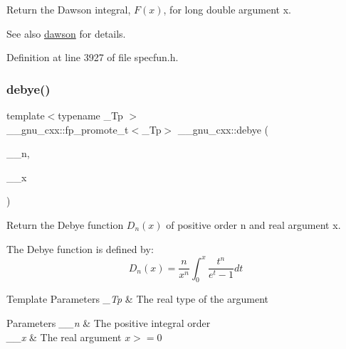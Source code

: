 Return the Dawson integral, $ F(x) $, for {\ttfamily long double} argument {\ttfamily x}.

\begin{DoxySeeAlso}{See also}
\hyperlink{group__mathsf__gnu_gabc97cbc04fdd23593e8dccbc1421dad5}{dawson} for details. 
\end{DoxySeeAlso}


Definition at line 3927 of file specfun.\+h.

\mbox{\label{group__mathsf__gnu_ga0b14de47c011de3ebf771c9f29b2b78c}} 
\subsubsection{\texorpdfstring{debye()}{debye()}}
{\footnotesize\ttfamily template$<$typename \+\_\+\+Tp $>$ \\
\+\_\+\+\_\+gnu\+\_\+cxx\+::fp\+\_\+promote\+\_\+t$<$\+\_\+\+Tp$>$ \+\_\+\+\_\+gnu\+\_\+cxx\+::debye (\begin{DoxyParamCaption}\item[{unsigned int}]{\+\_\+\+\_\+n,  }\item[{\+\_\+\+Tp}]{\+\_\+\+\_\+x }\end{DoxyParamCaption})\hspace{0.3cm}{\ttfamily [inline]}}

Return the Debye function $ D_n(x) $ of positive order {\ttfamily n} and real argument {\ttfamily x}.

The Debye function is defined by\+: \[ D_n(x) = \frac{n}{x^n}\int_{0}^{x}\frac{t^n}{e^t-1}dt \]


\begin{DoxyTemplParams}{Template Parameters}
{\em \+\_\+\+Tp} & The real type of the argument \\
\hline
\end{DoxyTemplParams}

\begin{DoxyParams}{Parameters}
{\em \+\_\+\+\_\+n} & The positive integral order \\
\hline
{\em \+\_\+\+\_\+x} & The real argument $ x >= 0 $ \\
\hline
\end{DoxyParams}


